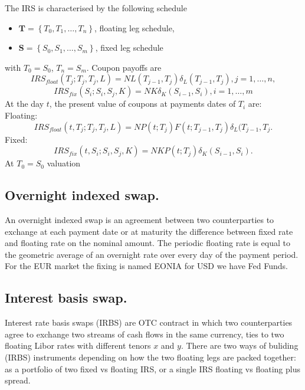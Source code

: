 \documentclass{book}
\begin{document}
The IRS is characterised by the following schedule
\begin{itemize}
\item $\mathbf{T}=\left\{T_{0},T_{1},\dots,T_{n}\right\}$, floating leg schedule,
\item $\mathbf{S}=\left\{S_{0},S_{1},\dots,S_{m}\right\}$, fixed leg schedule
\end{itemize}
with $T_{0}=S_{0}$, $T_{n}=S_{m}$.
Coupon payoffs are
$$
IRS_{float}(T_{j};T_{j},T_{j},L)=NL(T_{j-1},T_{j})\delta_{L}(T_{j-1},T_{j}), j=1,\dots,n,
$$
$$
IRS_{fix}(S_{i};S_{i},S_{j},K)=NK\delta_{K}(S_{i-1},S_{i}), i=1,\dots,m
$$
At the day $t$, the present value of coupons at payments dates of $T_{i}$ are:\\
Floating:
$$
IRS_{float}(t,T_{j};T_{j},T_{j},L)=NP(t;T_{j})F(t;T_{j-1},T_{j})\delta_{L}(T_{j-1},T_{j}.
$$
Fixed:
$$
IRS_{fix}(t,S_{i};S_{i},S_{j},K)=NKP(t;T_{j})\delta_{K}(S_{i-1},S_{i}).
$$
At $T_{0}=S_{0}$ valuation
\subsection{Overnight indexed swap.}
An overnight indexed swap is an agreement between two counterparties to exchange at each payment date or at maturity the difference between fixed rate and floating rate on the nominal amount. The periodic floating rate is equal to the geometric average of an overnight rate over every day of the payment period. For the EUR market the fixing is named EONIA for USD we have Fed Funds.
\subsection{Interest basis swap.}
Interest rate basis swaps (IRBS) are OTC contract in which two counterparties agree to exchange two streams of cash flows in the same currency, ties to two floating Libor rates with different tenors $x$ and $y$. There are two ways of buliding (IRBS) instruments depending on how the two floating legs are packed together: as a portfolio of two fixed vs floating IRS, or a single IRS floating vs floating plus spread.
\end{document}
